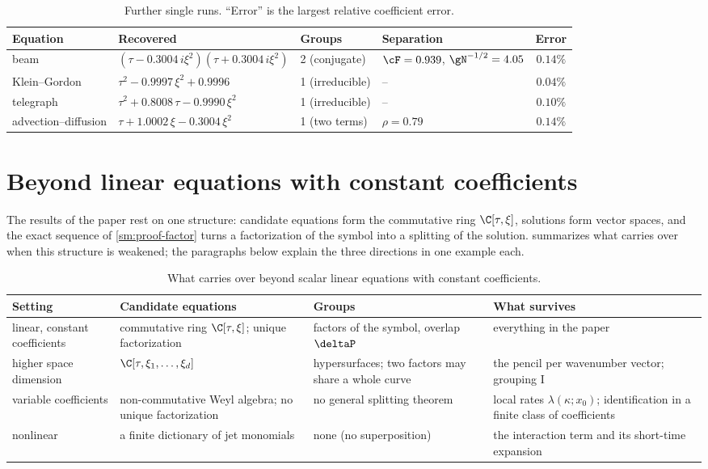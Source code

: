 \begin{table}[htbp]
\centering\small
\caption{Further single runs. ``Error'' is the largest relative coefficient error.}\label{sm:tab:cases}
\footnotesize
\begin{tabular}{@{}llllc@{}}
\toprule
Equation & Recovered & Groups & Separation & Error\\
\midrule
beam & $(\tau-0.3004\,i\xi^2)(\tau+0.3004\,i\xi^2)$ & 2 (conjugate) & $\cF=0.939$, $\gN^{-1/2}=4.05$ & $0.14\%$\\
Klein--Gordon & $\tau^2-0.9997\,\xi^2+0.9996$ & 1 (irreducible) & -- & $0.04\%$\\
telegraph & $\tau^2+0.8008\,\tau-0.9990\,\xi^2$ & 1 (irreducible) & -- & $0.10\%$\\
advection--diffusion & $\tau+1.0002\,\xi-0.3004\,\xi^2$ & 1 (two terms) & $\rho=0.79$ & $0.14\%$\\
\bottomrule
\end{tabular}
\end{table}



\section{Beyond linear equations with constant coefficients}\label{sm:beyond}
The results of the paper rest on one structure: candidate equations form the commutative ring $\C[\tau,\xi]$, solutions
form vector spaces, and the exact sequence of \cref{sm:proof-factor} turns a factorization of the symbol into a splitting
of the solution.  summarizes what carries over when this structure is weakened; the paragraphs below
explain the three directions in one example each.

\begin{table}[htbp]
\centering\small
\caption{What carries over beyond scalar linear equations with constant coefficients.}\label{sm:tab:beyond}
\begin{tabularx}{\linewidth}{@{}>{\raggedright\arraybackslash}p{2.1cm}>{\raggedright\arraybackslash}X>{\raggedright\arraybackslash}X>{\raggedright\arraybackslash}X@{}}
\toprule
Setting & Candidate equations & Groups & What survives\\
\midrule
linear, constant coefficients & commutative ring $\C[\tau,\xi]$; unique factorization & factors of the symbol, overlap
$\deltaP$ & everything in the paper\\
higher space dimension & $\C[\tau,\xi_1,\dots,\xi_d]$ & hypersurfaces; two factors may share a whole curve & the pencil per
wavenumber vector; grouping I\\
variable coefficients & non-commutative Weyl algebra; no unique factorization & no general splitting theorem & local rates
$\lambda(\kappa;x_0)$; identification in a finite class of coefficients\\
nonlinear & a finite dictionary of jet monomials & none (no superposition) & the interaction term and its short-time
expansion\\
\bottomrule
\end{tabularx}
\end{table}

